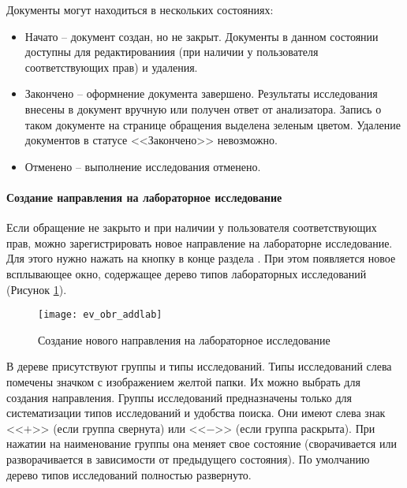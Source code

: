 Документы могут находиться в нескольких состояниях:
\begin{itemize}
 \item Начато -- документ создан, но не закрыт. Документы в данном состоянии доступны для редактированиия (при наличии у пользователя соответствующих прав) и удаления. 
 \item Закончено -- оформнение документа завершено. Результаты исследования внесены в документ вручную или получен ответ от анализатора. Запись о таком документе на странице обращения выделена зеленым цветом. Удаление документов в статусе <<Закончено>> невозможно.
 \item Отменено -- выполнение исследования отменено.
\end{itemize}

\paragraph{Создание направления на лабораторное исследование}

Если обращение не закрыто и при наличии у пользователя соответствующих прав, можно зарегистрировать новое направление на лабораторне исследование. Для этого нужно нажать на кнопку  в конце раздела . При этом появляется новое всплывающее окно, содержащее дерево типов лабораторных исследований (Рисунок \ref{img_ev_obr_addlab}).

\begin{figure}[ht]\centering
 \texttt{[image: ev\_obr\_addlab]}
 \caption{Создание нового направления на лабораторное исследование}
 \label{img_ev_obr_addlab}
\end{figure}

В дереве присутствуют группы и типы исследований. Типы исследований слева помечены значком с изображением желтой папки. Их можно выбрать для создания направления. Группы исследований предназначены только для систематизации типов исследований и удобства поиска. Они имеют слева знак <<$+$>> (если группа свернута) или <<$-$>> (если группа раскрыта). При нажатии на наименование группы она меняет свое состояние (сворачивается или разворачивается в зависимости от предыдущего состояния). По умолчанию дерево типов исследований полностью развернуто. 

